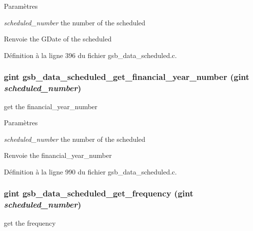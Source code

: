 \begin{DoxyParams}{Paramètres}
\item[{\em scheduled\_\-number}]the number of the scheduled\end{DoxyParams}
\begin{DoxyReturn}{Renvoie}
the GDate of the scheduled 
\end{DoxyReturn}


Définition à la ligne 396 du fichier gsb\_\-data\_\-scheduled.c.

\subsubsection[{gsb\_\-data\_\-scheduled\_\-get\_\-financial\_\-year\_\-number}]{\setlength{\rightskip}{0pt plus 5cm}gint gsb\_\-data\_\-scheduled\_\-get\_\-financial\_\-year\_\-number (gint {\em scheduled\_\-number})}\label{gsb__data__scheduled_8c_a11bf3eb936d3cafc51cfe1fbd3d6a770}
get the financial\_\-year\_\-number


\begin{DoxyParams}{Paramètres}
\item[{\em scheduled\_\-number}]the number of the scheduled\end{DoxyParams}
\begin{DoxyReturn}{Renvoie}
the financial\_\-year\_\-number 
\end{DoxyReturn}


Définition à la ligne 990 du fichier gsb\_\-data\_\-scheduled.c.

\subsubsection[{gsb\_\-data\_\-scheduled\_\-get\_\-frequency}]{\setlength{\rightskip}{0pt plus 5cm}gint gsb\_\-data\_\-scheduled\_\-get\_\-frequency (gint {\em scheduled\_\-number})}\label{gsb__data__scheduled_8c_a60ab7adb921a63a38d8bcaec72d4165d}
get the frequency


